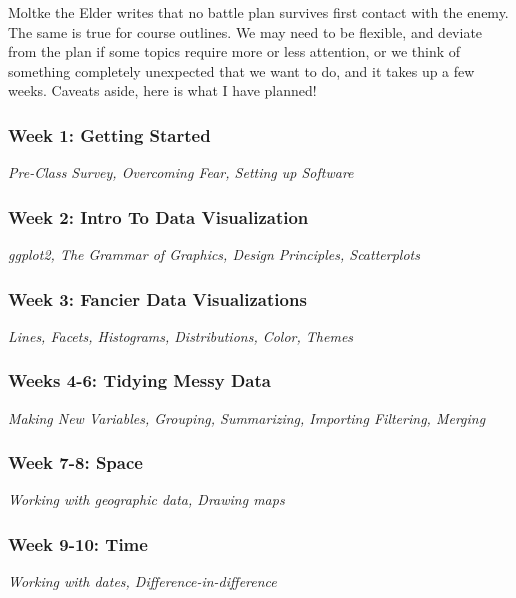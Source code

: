 \documentclass[11pt, letterpaper]{article}
\begin{document}
Moltke the Elder writes that no battle plan survives first contact with the enemy. The same is true for course outlines. We may need to be flexible, and deviate from the plan if some topics require more or less attention, or we think of something completely unexpected that we want to do, and it takes up a few weeks. Caveats aside, here is what I have planned!

\subsubsection*{Week 1: Getting Started}
\textit{Pre-Class Survey, Overcoming Fear, Setting up Software}

\subsubsection*{Week 2: Intro To Data Visualization}
\textit{ggplot2, The Grammar of Graphics, Design Principles, Scatterplots}

\subsubsection*{Week 3: Fancier Data Visualizations}
\textit{Lines, Facets, Histograms, Distributions, Color, Themes}

\subsubsection*{Weeks 4-6: Tidying Messy Data}
\textit{Making New Variables, Grouping, Summarizing, Importing Filtering, Merging}

\subsubsection*{Week 7-8: Space}
\textit{Working with geographic data, Drawing maps}

\subsubsection*{Week 9-10: Time}
\textit{Working with dates, Difference-in-difference}
\end{document}
